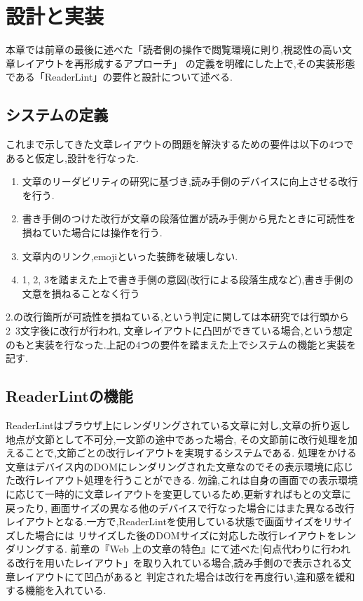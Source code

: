 

\chapter{設計と実装}
\label{chap:system}
本章では前章の最後に述べた「読者側の操作で閲覧環境に則り,視認性の高い文章レイアウトを再形成するアプローチ」
の定義を明確にした上で,その実装形態である「ReaderLint」の要件と設計について述べる.

\newpage

\section{システムの定義}
これまで示してきた文章レイアウトの問題を解決するための要件は以下の4つであると仮定し,設計を行なった.
\begin{enumerate}
	\item 文章のリーダビリティの研究に基づき,読み手側のデバイスに向上させる改行を行う.
	\item 書き手側のつけた改行が文章の段落位置が読み手側から見たときに可読性を損ねていた場合には操作を行う.
	\item 文章内のリンク,emojiといった装飾を破壊しない.
	\item 1, 2, 3を踏まえた上で書き手側の意図(改行による段落生成など),書き手側の文意を損ねることなく行う
\end{enumerate}
2.の改行箇所が可読性を損ねている,という判定に関しては本研究では行頭から2~3文字後に改行が行われ,
文章レイアウトに凸凹ができている場合,という想定のもと実装を行なった.上記の4つの要件を踏まえた上でシステムの機能と実装を記す.

\section{ReaderLintの機能}
ReaderLintはブラウザ上にレンダリングされている文章に対し,文章の折り返し地点が文節として不可分,一文節の途中であった場合,
その文節前に改行処理を加えることで,文節ごとの改行レイアウトを実現するシステムである.
処理をかける文章はデバイス内のDOMにレンダリングされた文章なのでその表示環境に応じた改行レイアウト処理を行うことができる.
勿論,これは自身の画面での表示環境に応じて一時的に文章レイアウトを変更しているため,更新すればもとの文章に戻ったり,
画面サイズの異なる他のデバイスで行なった場合にはまた異なる改行レイアウトとなる.一方で,ReaderLintを使用している状態で画面サイズをリサイズした場合には
リサイズした後のDOMサイズに対応した改行レイアウトをレンダリングする.
前章の『Web 上の文章の特色』にて述べた[句点代わりに行われる改行を用いたレイアウト」を取り入れている場合,読み手側ので表示される文章レイアウトにて凹凸があると
判定された場合は改行を再度行い,違和感を緩和する機能を入れている.

